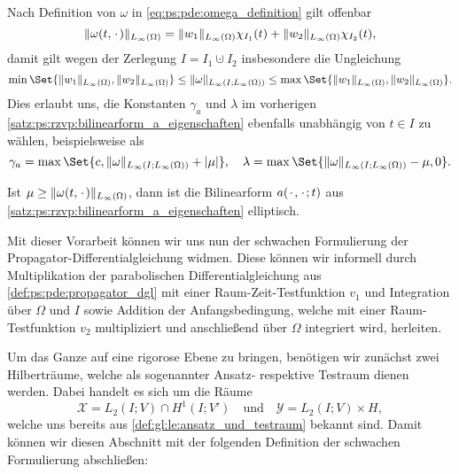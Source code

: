 \begin{Bemerkung}
\label{bemerkung:rzvp:bilinearform_zeitunabhaengig}
    Nach Definition von $\omega$ in \cref{eq:ps:pde:omega_definition} gilt offenbar
    \begin{equation}
        \lVert\omega(t, {\mkern2mu\cdot\mkern2mu})\rVert_{L_{\infty}(\Omega)} = \lVert w_{1}\rVert_{L_{\infty}(\Omega)} \chi_{I_{1}}(t) + \lVert w_{2}\rVert_{L_{\infty}(\Omega)} \chi_{I_{2}}(t),
    \end{equation}
    damit gilt wegen der Zerlegung $I = I_{1} \cupdot I_{2}$ insbesondere die Ungleichung
    \begin{equation}
        \min\Set{ \norm{w_{1}}_{L_{\infty}(\Omega)}, \norm{w_{2}}_{L_{\infty}(\Omega)} } \leq \norm{\omega}_{L_{\infty}(I; L_{\infty}(\Omega))} \leq \max\Set{ \norm{w_{1}}_{L_{\infty}(\Omega)}, \norm{w_{2}}_{L_{\infty}(\Omega)} }.
    \end{equation}
    Dies erlaubt uns, die Konstanten $\gamma_{a}$ und $\lambda$ im vorherigen \cref{satz:ps:rzvp:bilinearform_a_eigenschaften} ebenfalls unabhängig von $t \in I$ zu wählen, beispielsweise als
    \begin{equation}
        \gamma_{a} = \max\Set{c, \norm{\omega}_{L_{\infty}(I; L_{\infty}(\Omega))} + \abs{\mu}}, \quad
        \lambda = \max\Set{\norm{\omega}_{L_{\infty}(I; L_{\infty}(\Omega))} - \mu, 0}.
    \end{equation}
\end{Bemerkung}

\begin{Korollar}
\label{kor:ps:rzvp:bilinearform_elliptisch}
    Ist $\mu \geq \lVert\omega(t, {\mkern2mu\cdot\mkern2mu})\rVert_{L_{\infty}(\Omega)}$, dann ist die Bilinearform $a({\mkern2mu\cdot\mkern2mu}, {\mkern2mu\cdot\mkern2mu}; t)$ aus \cref{satz:ps:rzvp:bilinearform_a_eigenschaften} elliptisch.
\end{Korollar}


Mit dieser Vorarbeit können wir uns nun der schwachen Formulierung der Propagator-Differentialgleichung widmen.
Diese können wir informell durch Multiplikation der parabolischen Differentialgleichung aus \cref{def:ps:pde:propagator_dgl} mit einer Raum-Zeit-Testfunktion $v_{1}$ und Integration über $\Omega$ und $I$ sowie Addition der Anfangsbedingung, welche mit einer Raum-Testfunktion $v_{2}$ multipliziert und anschließend über $\Omega$ integriert wird, herleiten.

Um das Ganze auf eine rigorose Ebene zu bringen, benötigen wir zunächst zwei Hilberträume, welche als sogenannter Ansatz- respektive Testraum dienen werden.
Dabei handelt es sich um die Räume
\begin{equation}
    \label{eq:ps:rzvp:ansatzraum_testraum}
    \mathcal X = L_{2}(I; V) \cap H^{1}(I; V')
    \quad \text{und} \quad
    \mathcal Y = L_{2}(I; V) \times H,
\end{equation}
welche uns bereits aus \cref{def:gl:le:ansatz_und_testraum} bekannt sind.
Damit können wir diesen Abschnitt mit der folgenden Definition der schwachen Formulierung abschließen:

